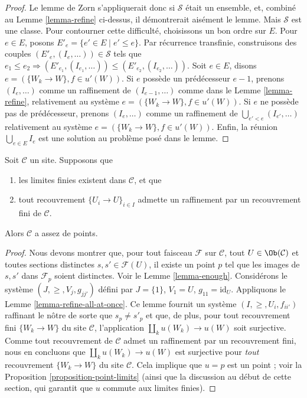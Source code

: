 \begin{proof}
\medskip\noindent
Le lemme de Zorn s’appliquerait donc si $\mathcal{S}$ était un ensemble,
et, combiné au Lemme \ref{lemma-refine} ci-dessus, il démontrerait aisément
le lemme. Mais $\mathcal{S}$ est une classe. Pour contourner cette difficulté,
choisissons un bon ordre sur $E$.
Pour $e \in E$, posons $E'_e = \{e' \in E \mid e' \leq e\}$.
Par récurrence transfinie, construisons des couples
$(E'_e, (I_e, \ldots)) \in \mathcal{S}$ tels que
$e_1 \leq e_2 \Rightarrow (E'_{e_1}, (I_{e_1}, \ldots))
\leq (E'_{e_2}, (I_{e_2}, \ldots))$.
Soit $e \in E$, disons $e = (\{W_k \to W\}, f\in u'(W))$.
Si $e$ possède un prédécesseur $e - 1$, prenons
$(I_e, \ldots)$ comme un raffinement de $(I_{e - 1}, \ldots)$
comme dans le Lemme \ref{lemma-refine}, relativement au système
$e = (\{W_k \to W\}, f\in u'(W))$.
Si $e$ ne possède pas de prédécesseur, prenons
$(I_e, \ldots)$ comme un raffinement de $\bigcup_{e' < e} (I_{e'}, \ldots)$
relativement au système
$e = (\{W_k \to W\}, f\in u'(W))$.
Enfin, la réunion $\bigcup_{e \in E} I_e$ est une solution au
problème posé dans le lemme.
\end{proof}

\begin{proposition}
\label{proposition-criterion-points}
\begin{reference}
\cite[Expos\'e VI, Appendice de Deligne, Proposition 9.0]{SGA4}
\end{reference}
Soit $\mathcal{C}$ un site. Supposons que
\begin{enumerate}
\item les limites finies existent dans $\mathcal{C}$, et que
\item tout recouvrement $\{U_i \to U\}_{i \in I}$
admette un raffinement par un recouvrement fini de $\mathcal{C}$.
\end{enumerate}
Alors $\mathcal{C}$ a assez de points.
\end{proposition}

\begin{proof}
Nous devons montrer que, pour tout faisceau
$\mathcal{F}$ sur $\mathcal{C}$, tout $U \in \Ob(\mathcal{C})$
et toutes sections distinctes $s, s' \in \mathcal{F}(U)$, il existe
un point $p$ tel que les images de $s, s'$ dans
$\mathcal{F}_p$ soient distinctes. Voir le Lemme \ref{lemma-enough}.
Considérons le système $(J, \geq, V_j, g_{jj'})$
défini par $J = \{1\}$, $V_1 = U$, $g_{11} = \text{id}_U$.
Appliquons le Lemme \ref{lemma-refine-all-at-once}.
Ce lemme fournit un système
$(I, \geq, U_i, f_{ii'})$ raffinant le nôtre de sorte que
$s_p \not = s'_p$ et que, de plus, pour tout
recouvrement fini $\{W_k \to W\}$ du site $\mathcal{C}$, l’application
$\coprod_k u(W_k) \to u(W)$ soit surjective.
Comme tout recouvrement de $\mathcal{C}$ admet un raffinement par
un recouvrement fini, nous en concluons que
$\coprod_k u(W_k) \to u(W)$ est surjective pour {\it tout}
recouvrement $\{W_k \to W\}$ du site $\mathcal{C}$.
Cela implique que $u = p$ est un point ; voir la
Proposition \ref{proposition-point-limits} (ainsi que la discussion
au début de cette section, qui garantit que $u$
commute aux limites finies).
\end{proof}

